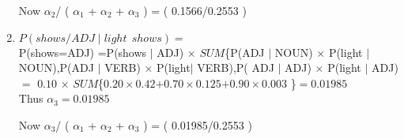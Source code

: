 \documentclass[11pt]{article}
\begin{document}
\begin{enumerate}
Now $\alpha_{2}$/ ( $\alpha_{1}$ + $\alpha_{2}$ + $\alpha_{3}$ ) = ( 0.1566/0.2553 )

\item $P(shows/ADJ \mid light\ \ shows)=$ \\

P(shows=ADJ) =P(shows $\mid $ ADJ) $\times$ $SUM$\{P(ADJ $\mid $ NOUN) $\times$ P(light $\mid $NOUN),\thinspace P(ADJ $\mid$ VERB) $\times$ P(light$ \mid$ VERB),\thinspace P( ADJ $\mid $ ADJ) $\times$ P(light $\mid$ ADJ) 
\\$=$ $0.10$ $\times$ $SUM$\{$0.20 \times 0.42$$ + $\thinspace $0.70 \times 0.125$$ + $\thinspace$0.90 \times 0.003$ \}$=0.01985$ \\

Thus $\alpha_{3}=0.01985$

Now $\alpha_{3}$/ ( $\alpha_{1}$ + $\alpha_{2}$ + $\alpha_{3}$ ) = ( 0.01985/0.2553 )

\end{enumerate}
\end{document}
